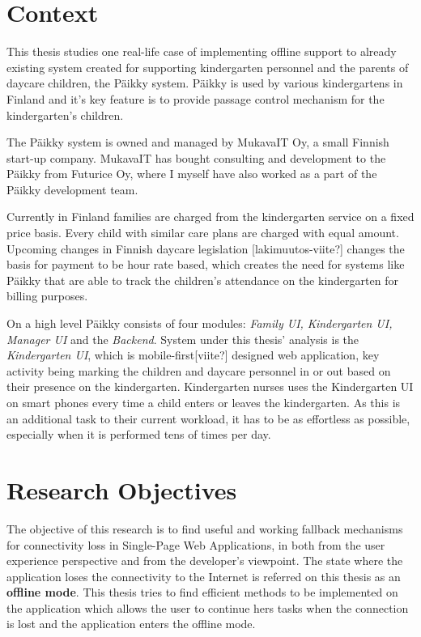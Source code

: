 



\section{Context}
This thesis studies one real-life case of implementing offline support to already existing system created for supporting kindergarten personnel and the parents of daycare children, the Päikky system. Päikky is used by various kindergartens in Finland and it's key feature is to provide passage control mechanism for the kindergarten's children.

The Päikky system is owned and managed by MukavaIT Oy, a small Finnish start-up company. MukavaIT has bought consulting and development to the Päikky from Futurice Oy, where I myself have also worked as a part of the Päikky development team.


Currently in Finland families are charged from the kindergarten service on a fixed price basis. Every child with similar care plans are charged with equal amount. Upcoming changes in Finnish daycare legislation [lakimuutos-viite?] changes the basis for payment to be hour rate based, which creates the need for systems like Päikky that are able to track the children's attendance on the kindergarten for billing purposes. 

On a high level Päikky consists of four modules: \textit{Family UI, Kindergarten UI, Manager UI} and the \textit{Backend}. System under this thesis' analysis is the \textit{Kindergarten UI}, which is mobile-first[viite?] designed web application, key activity being marking the children and daycare personnel in or out based on their presence on the kindergarten. Kindergarten nurses uses the Kindergarten UI on smart phones every time a child enters or leaves the kindergarten. As this is an additional task to their current workload, it has to be as effortless as possible, especially when it is performed tens of times per day.




\section{Research Objectives}
The objective of this research is to find useful and working fallback mechanisms for connectivity loss in Single-Page Web Applications, in both from the user experience perspective and from the developer's viewpoint. The state where the application loses the connectivity to the Internet is referred on this thesis as an \textbf{offline mode}. This thesis tries to find efficient methods to be implemented on the application which allows the user to continue hers tasks when the connection is lost and the application enters the offline mode.

